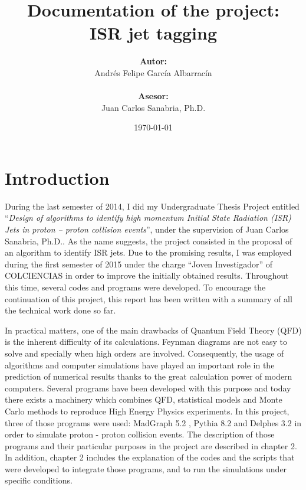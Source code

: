 \documentclass[12pt, oneside]{book}              %
\title{\bf Documentation of the project: \\ ISR jet tagging}
\author{\textbf{Autor:}\\ Andr\'es Felipe Garc\'ia Albarrac\'in \\ \\ \textbf{Asesor:} \\ Juan Carlos Sanabria, Ph.D.}
\date{\today}
\begin{document}
	\frontmatter                            %
	\maketitle                              %
	\tableofcontents                        %
	\mainmatter                             %

\chapter{Introduction}

During the last semester of 2014, I did my Undergraduate Thesis Project entitled ``\textit{Design of algorithms to 
identify high momentum Initial State Radiation (ISR) Jets in proton – proton collision events}'', under the supervision 
of Juan Carlos Sanabria, Ph.D.. As the name suggests, the project consisted in the proposal of an algorithm to identify
ISR jets. Due to the promising results, I was employed during the first semester of 2015 under the charge ``Joven 
Investigador'' of COLCIENCIAS in order to improve the initially obtained results. Throughout this time, several codes
and programs were developed. To encourage the continuation of this project, this report has been written with a 
summary of all the technical work done so far.

In practical matters, one of the main drawbacks of Quantum Field Theory (QFD) is the inherent difficulty of its calculations.
Feynman diagrams are not easy to solve and specially when high orders are involved. Consequently, the usage of algorithms
and computer simulations have played an important role in the prediction of numerical results thanks to the great 
calculation power of modern computers. Several programs have been developed with this purpose and today there exists a
machinery which combines QFD, statistical models and Monte Carlo methods to reproduce High Energy Physics experiments.
In this project, three of those programs were used: MadGraph 5.2 \cite{MadGraph}, Pythia 8.2 \cite{Pythia} 
\cite{Sjostrand:2006za} and Delphes 3.2 \cite{Delphes} in order to simulate proton - proton collision events. 
The description of those programs and their particular purposes in the project are described in chapter 2. In addition, 
chapter 2 includes the explanation of the codes and the scripts that were developed to integrate those programs, and to
run the simulations under specific conditions.
\end{document}
